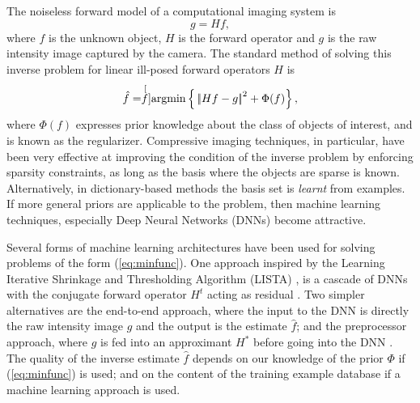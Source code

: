 \documentclass[10pt,twocolumn,letterpaper]{article}
\begin{document}
The noiseless forward model of a computational imaging system is
\begin{equation}
g=Hf, 
\label{eq:gHf}
\end{equation}
where $f$ is the unknown object, $H$ is the forward operator and $g$ is the raw intensity image captured by the camera. The standard method of solving this inverse problem for linear ill-posed forward operators $H$ is 
\begin{equation}
   \hat{f}=\stackrel[f]{}{\text{argmin}} \left\{\rule[-1ex]{0cm}{3ex} 
\left|\!\left| Hf-g \right|\!\right|^2 +
\Phi(f)
\right\},
\label{eq:minfunc}
\end{equation}
where $\Phi(f)$ expresses prior knowledge about the class of objects of interest, and is known as the regularizer. Compressive imaging techniques\cite{inv:candes-romberg-tao06a,inv:candes-romberg-tao06b,inv:candes-tao06,inv:donoho2006compressed}, in particular, have been very effective at improving the condition of the inverse problem by enforcing sparsity constraints, as long as the basis where the objects are sparse is known. Alternatively, in dictionary-based methods \cite{inv:elad2006image,inv:aharon2006k,inv:rubinstein2010dictionaries} the basis set is {\em learnt} from examples. If more general priors are applicable to the problem, then machine learning techniques, especially Deep Neural Networks \cite{lecun2015deep} (DNNs) become attractive. 

Several forms of machine learning architectures have been used for solving problems of the form (\ref{eq:minfunc}). One approach inspired by the Learning Iterative Shrinkage and Thresholding Algorithm (LISTA) \cite{gregor2010learning}, is a cascade of DNNs with the conjugate forward operator $H^t$ acting as residual \cite{inv:mardani2017b}. Two simpler alternatives are the end-to-end approach, where the input to the DNN is directly the raw intensity image $g$ and the output is the estimate $\hat{f}$\cite{sinha2017lensless,rivenson2017deep}; and the preprocessor approach, where $g$ is fed into an approximant $H^*$ before going into the DNN \cite{rivenson2017deep,goy2018low}. The quality of the inverse estimate $\hat{f}$ depends on our knowledge of the prior $\Phi$ if (\ref{eq:minfunc}) is used; and on the content of the training example database if a machine learning approach is used. 
\end{document}
